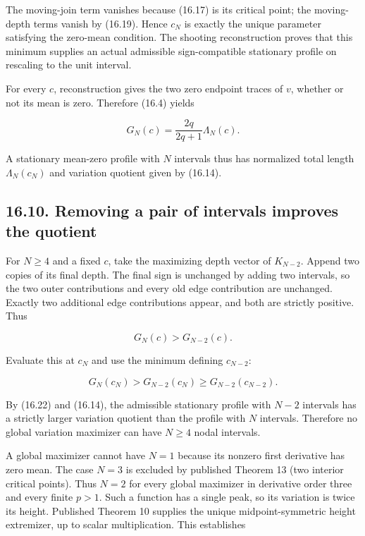\documentclass[11pt]{article}
\begin{document}
The moving-join term vanishes because (16.17) is its critical point; the
moving-depth terms vanish by (16.19). Hence \(c_N\) is exactly the
unique parameter satisfying the zero-mean condition. The shooting
reconstruction proves that this minimum supplies an actual admissible
sign-compatible stationary profile on rescaling to the unit interval.

For every \(c\), reconstruction gives the two zero endpoint traces of
\(v\), whether or not its mean is zero. Therefore (16.4) yields

\[
G_N(c)=\frac{2q}{2q+1}\Lambda_N(c).
\tag{16.22}
\]

A stationary mean-zero profile with \(N\) intervals thus has normalized
total length \(\Lambda_N(c_N)\) and variation quotient given by (16.14).

\subsection{16.10. Removing a pair of intervals improves the
quotient}\label{removing-a-pair-of-intervals-improves-the-quotient}

For \(N\ge4\) and a fixed \(c\), take the maximizing depth vector of
\(K_{N-2}\). Append two copies of its final depth. The final sign is
unchanged by adding two intervals, so the two outer contributions and
every old edge contribution are unchanged. Exactly two additional edge
contributions appear, and both are strictly positive. Thus

\[
G_N(c)>G_{N-2}(c).
\tag{16.23}
\]

Evaluate this at \(c_N\) and use the minimum defining \(c_{N-2}\):

\[
G_N(c_N)>G_{N-2}(c_N)\ge G_{N-2}(c_{N-2}).
\tag{16.24}
\]

By (16.22) and (16.14), the admissible stationary profile with \(N-2\)
intervals has a strictly larger variation quotient than the profile with
\(N\) intervals. Therefore no global variation maximizer can have
\(N\ge4\) nodal intervals.

A global maximizer cannot have \(N=1\) because its nonzero first
derivative has zero mean. The case \(N=3\) is excluded by published
Theorem 13 (two interior critical points). Thus \(N=2\) for every global
maximizer in derivative order three and every finite \(p>1\). Such a
function has a single peak, so its variation is twice its height.
Published Theorem 10 supplies the unique midpoint-symmetric height
extremizer, up to scalar multiplication. This establishes
\end{document}
